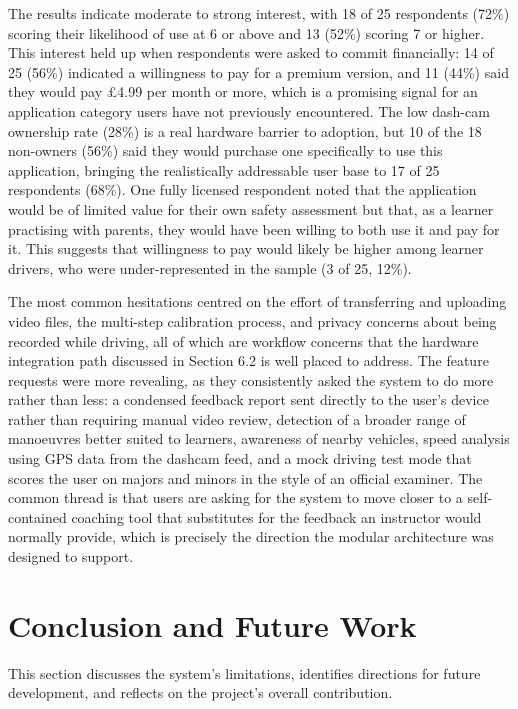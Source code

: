 \documentclass{article}
\begin{document}
The results indicate moderate to strong interest, with 18 of 25 respondents (72\%) scoring their likelihood of use at 6 or above and 13 (52\%) scoring 7 or higher. This interest held up when respondents were asked to commit financially: 14 of 25 (56\%) indicated a willingness to pay for a premium version, and 11 (44\%) said they would pay \pounds4.99 per month or more, which is a promising signal for an application category users have not previously encountered. The low dash-cam ownership rate (28\%) is a real hardware barrier to adoption, but 10 of the 18 non-owners (56\%) said they would purchase one specifically to use this application, bringing the realistically addressable user base to 17 of 25 respondents (68\%). One fully licensed respondent noted that the application would be of limited value for their own safety assessment but that, as a learner practising with parents, they would have been willing to both use it and pay for it. This suggests that willingness to pay would likely be higher among learner drivers, who were under-represented in the sample (3 of 25, 12\%).

The most common hesitations centred on the effort of transferring and uploading video files, the multi-step calibration process, and privacy concerns about being recorded while driving, all of which are workflow concerns that the hardware integration path discussed in Section 6.2 is well placed to address. The feature requests were more revealing, as they consistently asked the system to do more rather than less: a condensed feedback report sent directly to the user's device rather than requiring manual video review, detection of a broader range of manoeuvres better suited to learners, awareness of nearby vehicles, speed analysis using GPS data from the dashcam feed, and a mock driving test mode that scores the user on majors and minors in the style of an official examiner. The common thread is that users are asking for the system to move closer to a self-contained coaching tool that substitutes for the feedback an instructor would normally provide, which is precisely the direction the modular architecture was designed to support.

\newpage

\section{Conclusion and Future Work}
This section discusses the system's limitations, identifies directions for future development, and reflects on the project's overall contribution.
\end{document}
